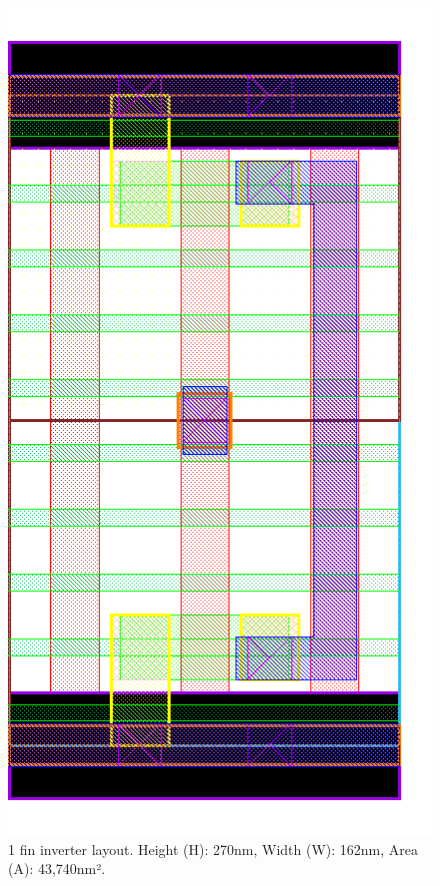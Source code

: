 \documentclass[pgmicro,diss,english]{iiufrgs}
\begin{document}
\begin{figure}[]
\centering
\includegraphics[width=\textwidth,height=\textheight,keepaspectratio]{INV1F.png}
\caption{1 fin inverter layout. Height (H): 270nm, Width (W): 162nm, Area (A): 43,740nm².}
\label{fig:INV1F}
\end{figure}
\end{document}
